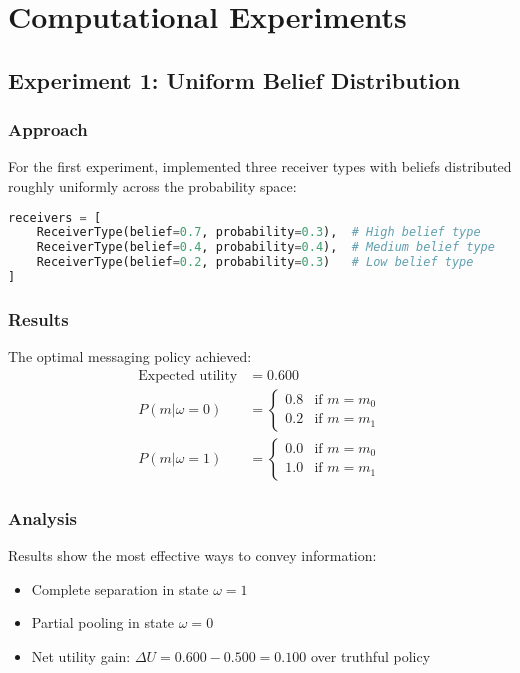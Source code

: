 \documentclass[12pt]{article}
\theoremstyle{plain}
\theoremstyle{definition}
\theoremstyle{remark}
\begin{document}
\section{Computational Experiments}

\subsection{Experiment 1: Uniform Belief Distribution}

\subsubsection{Approach}
For the first experiment, implemented three receiver types with beliefs distributed roughly uniformly across the probability space:

\begin{lstlisting}[language=Python, caption=Experiment 1 Setup]
receivers = [
    ReceiverType(belief=0.7, probability=0.3),  # High belief type
    ReceiverType(belief=0.4, probability=0.4),  # Medium belief type
    ReceiverType(belief=0.2, probability=0.3)   # Low belief type
]
\end{lstlisting}

\subsubsection{Results}
The optimal messaging policy achieved:
\begin{align*}
    \text{Expected utility} &= 0.600 \\
    P(m|\omega=0) &= \begin{cases}
        0.8 & \text{if } m = m_0 \\
        0.2 & \text{if } m = m_1
    \end{cases} \\
    P(m|\omega=1) &= \begin{cases}
        0.0 & \text{if } m = m_0 \\
        1.0 & \text{if } m = m_1
    \end{cases}
\end{align*}

\subsubsection{Analysis}
Results show the most effective ways to convey information:
\begin{itemize}
    \item Complete separation in state $\omega=1$
    \item Partial pooling in state $\omega=0$
    \item Net utility gain: $\Delta U = 0.600 - 0.500 = 0.100$ over truthful policy
\end{itemize}
\end{document}
